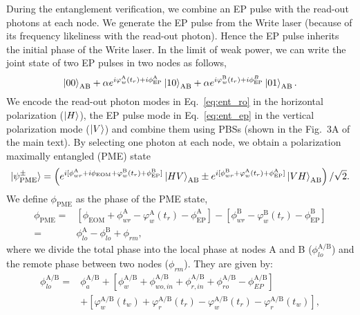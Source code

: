 \documentclass[aps,reprint,showpacs,superscriptaddress]{revtex4-2}
\begin{document}
During the entanglement verification, we combine an EP pulse with the read-out photons at each node. We generate the EP pulse from the Write laser (because of its frequency likeliness with the read-out photon). Hence the EP pulse inherits the initial phase of the Write laser. In the limit of weak power, we can write the joint state of two EP pulses in two nodes as follows,
 \begin{equation}\label{eq:ent_ep}
	\ket{00}_\textrm{AB}+\alpha e^{i\varphi_w^\textrm{A}(t_r)+i\phi_\textrm{EP}^\textrm{A}}\ket{10}_\textrm{AB}+\alpha e^{i\varphi_w^\textrm{B}(t_r)+i\phi_\textrm{EP}^B}\ket{01}_\textrm{AB}.
 \end{equation}
 We encode the read-out photon modes in Eq.~\ref{eq:ent_ro} in the horizontal polarization ($\ket{H}$), the EP pulse mode in Eq.~\ref{eq:ent_ep} in the vertical polarization mode ($\ket{V}$) and combine them using PBSs (shown in the Fig.~3A of the main text). By selecting one photon at each node, we obtain a polarization maximally entangled (PME) state
 \begin{equation}
	\ket{\psi_\textrm{PME}^\pm}=
	\left(e^{i[\phi_{wr}^\textrm{A}+i\phi_\textrm{EOM}+\varphi_w^\textrm{B}(t_r)+\phi_\textrm{EP}^\textrm{B}]}\ket{HV}_\textrm{AB}\pm e^{i[\phi_{wr}^\textrm{B}+\varphi_w^\textrm{A}(t_r)+\phi_\textrm{EP}^\textrm{A}]}\ket{VH}_\textrm{AB} \right)/\sqrt{2}.
 \end{equation}
We define $\phi_\textrm{PME}$ as the phase of the PME state,
\begin{equation}
	\begin{split}
	\phi_\textrm{PME}=&[\phi_\textrm{EOM}+\phi_{wr}^\textrm{A}-\varphi_w^\textrm{A}(t_r)-\phi_\textrm{EP}^\textrm{A}]-[\phi_{wr}^\textrm{B}-\varphi^\textrm{B}_w(t_r) - \phi_\textrm{EP}^\textrm{B}]\\
	=&\phi_{lo}^\textrm{A}-\phi_{lo}^\textrm{B}+\phi_{rm},
	\end{split}
 \end{equation}
where we divide the total phase into the local phase at nodes A and B ($\phi^\textrm{A/B}_{lo}$) and the remote phase between two nodes ($\phi_{rm}$). They are given by:
\begin{equation}\label{eq:local_phase}
	\begin{split}
		\phi_{lo}^\textrm{A/B}=
		 &\phi_a^\textrm{A/B}+
		\left[\phi_w^\textrm{A/B}+\phi_{wo,in}^\textrm{A/B}+\phi_{r,in}^\textrm{A/B}+\phi_{ro}^\textrm{A/B}-\phi_{EP}^\textrm{A/B}\right]\\
		&+\left[\varphi_w^\textrm{A/B}(t_w)+\varphi_{r}^\textrm{A/B}(t_r)-\varphi_{w}^\textrm{A/B}(t_r)-\varphi_{r}^\textrm{A/B}(t_w)\right],
	\end{split}
\end{equation}
\end{document}
